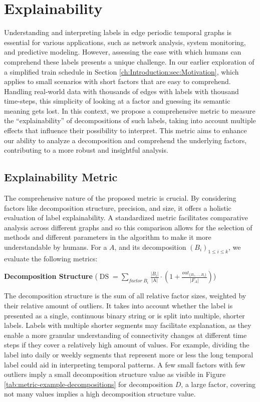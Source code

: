 \chapter{Explainability}
Understanding and interpreting labels in edge periodic temporal graphs is essential for various applications, such as network analysis, system monitoring, and predictive modeling.
However, assessing the ease with which humans can comprehend these labels presents a unique challenge.
In our earlier exploration of a simplified train schedule in Section \ref{ch:Introduction:sec:Motivation}, which applies to small scenarios with short factors that are easy to comprehend.
Handling real-world data with thousands of edges with labels with thousand time-steps, this simplicity of looking at a factor and guessing its semantic meaning gets lost.
In this context, we propose a comprehensive metric to measure the \enquote{explainability} of decompositions of such labels, taking into account multiple effects that influence their possibility to interpret.
This metric aims to enhance our ability to analyze a decomposition and comprehend the underlying factors, contributing to a more robust and insightful analysis.

\section{Explainability Metric}
The comprehensive nature of the proposed metric is crucial.
By considering factors like decomposition structure, precision, and size, it offers a holistic evaluation of label explainability.
A standardized metric facilitates comparative analysis across different graphs and so this comparison allows for the selection of methods and different parameters in the algorithm to make it more understandable by humans.
For a \DFA $A$, and its decomposition $(B_i)_{1 \leq i \leq k}$, we evaluate the following metrics:

\textbf{Decomposition Structure} ($\operatorname{DS} = \sum\limits_{factor~ B_i}\frac{|B_i|}{\text{|A|}} \cdot (1 + \frac{out_{\{B_1,\dots,B_i\}}}{|F_A|})$)

The decomposition structure is the sum of all relative factor sizes, weighted by their relative amount of outliers.
It takes into account whether the label is presented as a single, continuous binary string or is split into multiple, shorter labels.
Labels with multiple shorter segments may facilitate explanation, as they enable a more granular understanding of connectivity changes at different time steps if they cover a relatively high amount of values.
For example, dividing the label into daily or weekly segments that represent more or less the long temporal label could aid in interpreting temporal patterns.
A few small factors with few outliers imply a small decomposition structure value as visible in Figure \ref{tab:metric-example-decompositions} for decomposition $D$, a large factor, covering not many values implies a high decomposition structure value.

